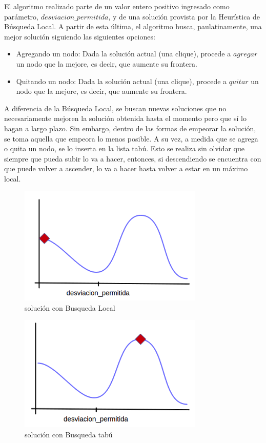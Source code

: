  El algoritmo realizado parte de un valor entero positivo ingresado como parámetro, $desviacion\_permitida$, y de una solución provista por la Heurística de Búsqueda Local. A partir de esta última, el algoritmo busca, paulatinamente, una mejor solución siguiendo las siguientes opciones:
\begin{itemize}
 \item Agregando un nodo: Dada la solución actual (una clique), procede a $agregar$ un nodo que la mejore, es decir, que aumente su frontera.
 \item Quitando un nodo: Dada la solución actual (una clique), procede a $quitar$ un nodo que la mejore, es decir, que aumente su frontera.
\end{itemize}
A diferencia de la Búsqueda Local, se buscan nuevas soluciones que no necesariamente mejoren la solución obtenida hasta el momento pero que sí lo hagan a largo plazo. Sin embargo, dentro de las formas de empeorar la solución, se toma aquella que empeora lo menos posible. A su vez, a medida que se agrega o quita un nodo, se lo inserta en la lista tabú. Esto se realiza sin olvidar que siempre que pueda subir lo va a hacer, entonces, si descendiendo se encuentra con que puede volver a ascender, lo va a hacer hasta volver a estar en un máximo local.\newline

\begin{figure}[H] %
\begin{center}
\includegraphics[width=250pt]{../imgs/1_tabu.png}
\caption{solución con Busqueda Local}
\end{center}
\end{figure}


\begin{figure}[H] %
\begin{center}
\includegraphics[width=250pt]{../imgs/2_tabu.png}
\caption{solución con Busqueda tabú}
\end{center}
\end{figure}

